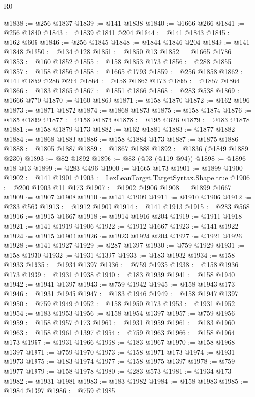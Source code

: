 \begin{lexlean}{R0}
\begin{coremodule}
@1838 := @256 @1837
@1839 := @141 @1838
@1840 := @1666 @266
@1841 := @256 @1840
@1843 := @1839 @1841 @204
@1844 := @141 @1843
@1845 := @162 @606
@1846 := @256 @1845
@1848 := @1844 @1846 @204
@1849 := @141 @1848
@1850 := @134 @128
@1851 := @1850 @13
@1852 := @1665 @1786
@1853 := @160 @1852
@1855 := @158 @1853 @173
@1856 := @288 @1855
@1857 := @158 @1856
@1858 := @1665 @1793
@1859 := @256 @1858
@1862 := @141 @1859 @286 @264
@1864 := @158 @1862 @173
@1865 := @1857 @1864
@1866 := @183 @1865
@1867 := @1851 @1866
@1868 := @283 @538
@1869 := @1666 @770
@1870 := @160 @1869
@1871 := @158 @1870
@1872 := @162 @196
@1873 := @1871 @1872
@1874 := @1868 @1873
@1875 := @158 @1874
@1876 := @185 @1869
@1877 := @158 @1876
@1878 := @195 @626
@1879 := @183 @1878
@1881 := @158 @1879 @173
@1882 := @162 @1881
@1883 := @1877 @1882
@1884 := @1868 @1883
@1886 := @158 @1884 @173
@1887 := @1875 @1886
@1888 := @1805 @1887
@1889 := @1867 @1888
@1892 := @1836 (@1849 @1889 @230)
@1893 := @82 @1892
@1896 := @83 (@93 (@119 @94))
@1898 := @1896 @18 @13
@1899 := @283 @496
@1900 := @1665 @173
@1901 := @1899 @1900
@1902 := @141 @1901
@1903 := LexLeanTarget.TargetSyntax.Shape.true
@1906 := @200 @1903 @11 @173
@1907 := @1902 @1906
@1908 := @1899 @1667
@1909 := @1907 @1908
@1910 := @141 @1909
@1911 := @1910 @1906
@1912 := @283 @563
@1913 := @1912 @1900
@1914 := @141 @1913
@1915 := @283 @568
@1916 := @1915 @1667
@1918 := @1914 @1916 @204
@1919 := @1911 @1918
@1921 := @141 @1919 @1906
@1922 := @1912 @1667
@1923 := @141 @1922
@1924 := @1915 @1900
@1926 := @1923 @1924 @204
@1927 := @1921 @1926
@1928 := @141 @1927
@1929 := @287 @1397
@1930 := @759 @1929
@1931 := @158 @1930
@1932 := @1931 @1397
@1933 := @183 @1932
@1934 := @158 @1933
@1935 := @1934 @1397
@1936 := @759 @1935
@1938 := @158 @1936 @173
@1939 := @1931 @1938
@1940 := @183 @1939
@1941 := @158 @1940
@1942 := @1941 @1397
@1943 := @759 @1942
@1945 := @158 @1943 @173
@1946 := @1931 @1945
@1947 := @183 @1946
@1949 := @158 @1947 @1397
@1950 := @759 @1949
@1952 := @158 @1950 @173
@1953 := @1931 @1952
@1954 := @183 @1953
@1956 := @158 @1954 @1397
@1957 := @759 @1956
@1959 := @158 @1957 @173
@1960 := @1931 @1959
@1961 := @183 @1960
@1963 := @158 @1961 @1397
@1964 := @759 @1963
@1966 := @158 @1964 @173
@1967 := @1931 @1966
@1968 := @183 @1967
@1970 := @158 @1968 @1397
@1971 := @759 @1970
@1973 := @158 @1971 @173
@1974 := @1931 @1973
@1975 := @183 @1974
@1977 := @158 @1975 @1397
@1978 := @759 @1977
@1979 := @158 @1978
@1980 := @283 @573
@1981 := @1934 @173
@1982 := @1931 @1981
@1983 := @183 @1982
@1984 := @158 @1983
@1985 := @1984 @1397
@1986 := @759 @1985

\end{coremodule}
\end{lexlean}
